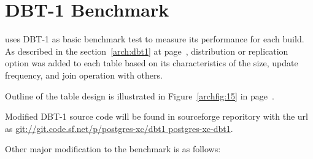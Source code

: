 %
%


\section{\label{sec:dbtOne}DBT-1 Benchmark}

  \XC{} uses DBT-1 as basic benchmark test to measure its performance for each build.
  As described in the section~\ref{arch:dbt1} at page~\pageref{arch:dbt1}, 
  distribution or replication option was added to each table based on
  its characteristics of the size, update
  frequency, and join operation with others.
  
  Outline of the table design is illustrated in Figure~\ref{archfig:15} in
  page~\pageref{archfig:15}.
  
  Modified DBT-1 source code will be found in sourceforge reporitory with the url as
  \url{git://git.code.sf.net/p/postgres-xc/dbt1 postgres-xc-dbt1}.
  
  Other major modification to the benchmark is as follows:
  
